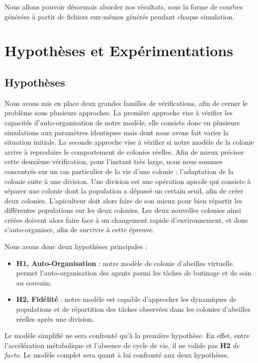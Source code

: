 		Nous allons pouvoir désormais aborder nos résultats, sous la forme de courbes générées à partir de fichiers eux-mêmes générés pendant chaque simulation. 
		
		
		
	\section{Hypothèses et Expérimentations}
		\subsection{Hypothèses}
			Nous avons mis en place deux grandes familles de vérifications, afin de cerner le problème sous plusieurs approches. La première approche vise à vérifier les capacités d'auto-organisation de notre modèle, elle consiste donc en plusieurs simulations aux paramètres identiques mais dont nous avons fait varier la situation initiale. La seconde approche vise à vérifier si notre modèle de la colonie arrive à reproduire le comportement de colonies réelles. Afin de mieux préciser cette deuxième vérification, pour l'instant très large, nous nous sommes concentrés sur un cas particulier de la vie d'une colonie : l'adaptation de la colonie suite à une division. Une division est une opération apicole qui consiste à séparer une colonie dont la population a dépassé un certain seuil, afin de créer deux colonies. L'apiculteur doit alors faire de son mieux pour bien répartir les différentes populations sur les deux colonies. Les deux nouvelles colonies ainsi créées doivent alors faire face à un changement rapide d'environnement, et donc s'auto-organiser, afin de survivre à cette épreuve.
			
			Nous avons donc deux hypothèses principales :
			\begin{itemize}
				\item \textbf{H1, Auto-Organisation} : notre modèle de colonie d'abeilles virtuelle permet l'auto-organisation des agents parmi les tâches de butinage et de soin au couvain;
				\item \textbf{H2, Fidélité} : notre modèle est capable d'approcher les dynamiques de populations et de répartition des tâches observées dans les colonies d'abeilles réelles après une division.
			\end{itemize}
			
		Le modèle simplifié ne sera confronté qu'à la première hypothèse. En effet, entre l'accélération métabolique et l'absence de cycle de vie, il ne valide pas \textbf{H2} \textit{de facto}. Le modèle complet sera quant à lui confronté aux deux hypothèses.
			

